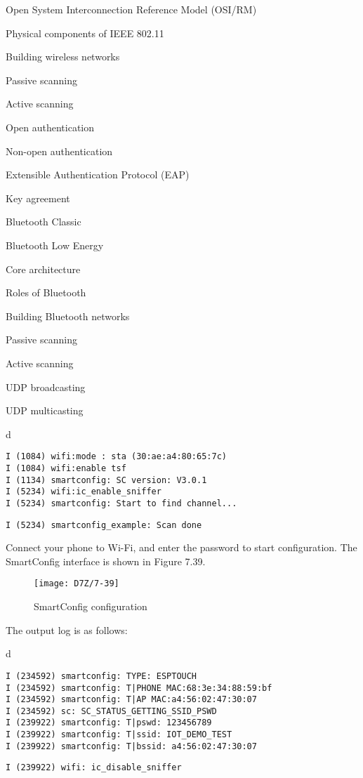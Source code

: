 \documentclass[a4paper,12pt]{book}
\begin{document}
\begin{term}{Open System Interconnection Reference Model (OSI/RM)}
\begin{term}{Physical components of IEEE 802.11}
\begin{term}{Building wireless networks}
\begin{term}{Passive scanning}
\begin{term}{Active scanning}
\begin{term}{Open authentication}
\begin{term}{Non-open authentication}
\begin{term}{Extensible Authentication Protocol (EAP)}
\begin{term}{Key agreement}
\begin{term}{Bluetooth Classic}
\begin{term}{Bluetooth Low Energy}
\begin{term}{Core architecture}
\begin{term}{Roles of Bluetooth}
\begin{term}{Building Bluetooth networks}
\begin{term}{Passive scanning}
\begin{term}{Active scanning}
\begin{term}{UDP broadcasting}
\begin{term}{UDP multicasting}
\begin{tabular}{d}
\vspace{2pt}
\begin{verbatim}
I (1084) wifi:mode : sta (30:ae:a4:80:65:7c)
I (1084) wifi:enable tsf
I (1134) smartconfig: SC version: V3.0.1
I (5234) wifi:ic_enable_sniffer
I (5234) smartconfig: Start to find channel...
\end{verbatim}
\verb|I (5234) smartconfig_example: Scan done|
\end{tabular}



Connect your phone to Wi-Fi, and enter the password to start configuration. The SmartConfig interface is shown in Figure 7.39.

\begin{figure}[!h]
    \centering
    \texttt{[image: D7Z/7-39]}
    \caption{SmartConfig configuration}
\end{figure}

The output log is as follows:


\begin{tabular}{d}
\vspace{2pt}
\begin{verbatim}
I (234592) smartconfig: TYPE: ESPTOUCH
I (234592) smartconfig: T|PHONE MAC:68:3e:34:88:59:bf
I (234592) smartconfig: T|AP MAC:a4:56:02:47:30:07
I (234592) sc: SC_STATUS_GETTING_SSID_PSWD
I (239922) smartconfig: T|pswd: 123456789
I (239922) smartconfig: T|ssid: IOT_DEMO_TEST
I (239922) smartconfig: T|bssid: a4:56:02:47:30:07
\end{verbatim}
\verb|I (239922) wifi: ic_disable_sniffer|
\end{tabular}




\end{term}
\end{term}
\end{term}
\end{term}
\end{term}
\end{term}
\end{term}
\end{term}
\end{term}
\end{term}
\end{term}
\end{term}
\end{term}
\end{term}
\end{term}
\end{term}
\end{term}
\end{term}
\end{document}

